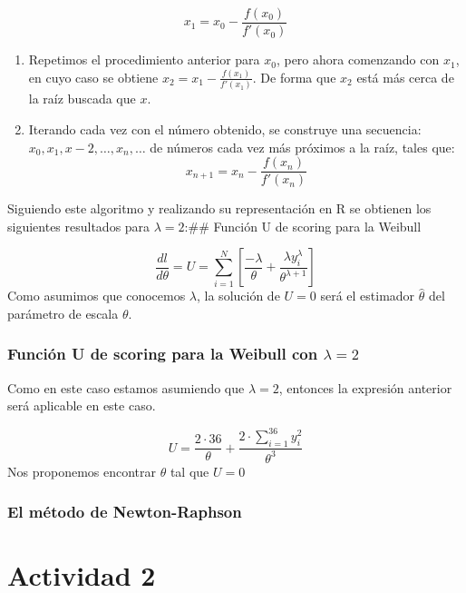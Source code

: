 \documentclass[
]{article}
\begin{document}
\[x_{1}=x_{0}−\frac{f(x_{0})}{f′(x_{0})}\]

\begin{enumerate}
\def\labelenumi{\arabic{enumi}.}
\setcounter{enumi}{5}
\item
  Repetimos el procedimiento anterior para \(x_{0}\), pero ahora
  comenzando con \(x_{1}\), en cuyo caso se obtiene
  \(x_{2}=x_{1}−\frac{f(x_{1})}{f′(x_{1})}\). De forma que \(x_{2}\)
  está más cerca de la raíz buscada que \(x\).
\item
  Iterando cada vez con el número obtenido, se construye una secuencia:
  \(x_{0},x_{1},x−2,…,x_{n},…\) de números cada vez más próximos a la
  raíz, tales que: \[x_{n+1}=x_{n}−\frac{f(x_{n})}{f′(x_{n})}\]
\end{enumerate}

Siguiendo este algoritmo y realizando su representación en R se obtienen
los siguientes resultados para \(\lambda=2\):\#\# Función U de scoring
para la Weibull

\[ \frac{dl}{d\theta}=U=\displaystyle\sum_{i=1}^{N}\left[ \frac{-\lambda}{\theta}+\frac{\lambda y^{\lambda}_{i}}{\theta^{\lambda+1}}\right]\]
Como asumimos que conocemos \(\lambda\), la solución de \(U=0\) será el
estimador \(\hat{\theta}\) del parámetro de escala \(\theta\).

\hypertarget{funciuxf3n-u-de-scoring-para-la-weibull-con-lambda2}{%
\subsubsection{\texorpdfstring{Función U de scoring para la Weibull con
\(\lambda=2\)}{Función U de scoring para la Weibull con \textbackslash lambda=2}}\label{funciuxf3n-u-de-scoring-para-la-weibull-con-lambda2}}

Como en este caso estamos asumiendo que \(\lambda=2\), entonces la
expresión anterior será aplicable en este caso.

\[U=\frac{2\cdot 36}{\theta}+\frac{2\cdot \displaystyle\sum_{i=1}^{36}y^{2}_{i}}{\theta^{3}}\]
Nos proponemos encontrar \(\theta\) tal que \(U=0\)

\hypertarget{el-muxe9todo-de-newton-raphson}{%
\subsubsection{El método de
Newton-Raphson}\label{el-muxe9todo-de-newton-raphson}}

\hypertarget{actividad-2}{%
\section{Actividad 2}\label{actividad-2}}
\end{document}
